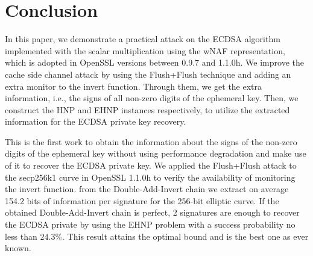 \section{Conclusion}
\label{sec:conclusion}
In this paper, we demonstrate a practical attack on the ECDSA algorithm implemented  with the scalar multiplication using the wNAF representation, which is adopted in OpenSSL versions between 0.9.7 and 1.1.0h.
We improve the cache side channel attack
 by using the Flush+Flush technique and adding an extra monitor to the invert function.
Through them, we get the extra information, i.e., the signs of all non-zero digits of the ephemeral key.
Then, we construct the HNP and EHNP instances respectively,  to utilize the extracted information for the ECDSA private key recovery.


This is the first work to obtain the information about the signs of the non-zero digits of the ephemeral key without using performance degradation and make use of it to recover the ECDSA private key.
We applied the Flush+Flush attack to the secp256k1 curve in OpenSSL 1.1.0h to verify the availability of monitoring the invert function.
from the Double-Add-Invert chain we extract on average 154.2 bits of information per signature for the 256-bit elliptic curve.
If the obtained Double-Add-Invert chain is perfect,
2 signatures are enough to recover the ECDSA private by using the EHNP problem with a success probability no less than $24.3\%$.
This result attains the optimal bound and is the best one as ever known.






